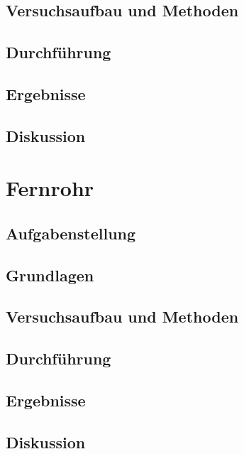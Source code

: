 \documentclass{article}
\begin{document}
\subsection{Versuchsaufbau und Methoden}
\subsection{Durchführung}
\subsection{Ergebnisse}
\subsection{Diskussion}

\section{Fernrohr}

\subsection{Aufgabenstellung}
\subsection{Grundlagen}
\subsection{Versuchsaufbau und Methoden}
\subsection{Durchführung}
\subsection{Ergebnisse}
\subsection{Diskussion}
\end{document}
